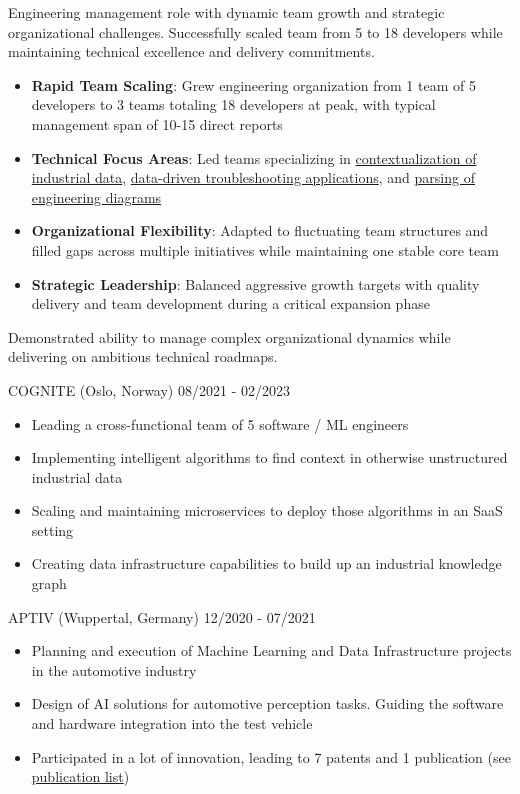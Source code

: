 \documentclass[singlesided,
               paper=a4,
               fontsize=10pt
              ]{my-resume}
\begin{document}
    {
        Engineering management role with dynamic team growth and strategic organizational challenges. Successfully scaled team from 5 to 18 developers while maintaining technical excellence and delivery commitments.

        \begin{itemize}[leftmargin=2em]
            \item \textbf{Rapid Team Scaling}: Grew engineering organization from 1 team of 5 developers to 3 teams totaling 18 developers at peak, with typical management span of 10-15 direct reports
            \item \textbf{Technical Focus Areas}: Led teams specializing in \href{https://www.cognite.com/en/contextualization}{contextualization of industrial data}, \href{https://www.cognite.com/en/industrial-canvas}{data-driven troubleshooting applications}, and \href{https://docs.cognite.com/cdf/integration/guides/contextualization/interactive_diagrams/}{parsing of engineering diagrams}
            \item \textbf{Organizational Flexibility}: Adapted to fluctuating team structures and filled gaps across multiple initiatives while maintaining one stable core team
            \item \textbf{Strategic Leadership}: Balanced aggressive growth targets with quality delivery and team development during a critical expansion phase
        \end{itemize}

        Demonstrated ability to manage complex organizational dynamics while delivering on ambitious technical roadmaps.
    }
%
	{COGNITE (Oslo, Norway)}
	{08/2021 - 02/2023}
    {\begin{itemize}[leftmargin=2em]
        \item Leading a cross-functional team of 5 software / ML engineers
        \item Implementing intelligent algorithms to find context in otherwise unstructured industrial data
        \item Scaling and maintaining microservices to deploy those algorithms in an SaaS setting
        \item Creating data infrastructure capabilities to build up an industrial knowledge graph
    \end{itemize}}
%
    {APTIV (Wuppertal, Germany)}
    {12/2020 - 07/2021}
    {\begin{itemize}[leftmargin=2em]
        \item Planning and execution of Machine Learning and Data Infrastructure projects in the automotive industry
        \item Design of AI solutions for automotive perception tasks. Guiding the software and hardware integration into the test vehicle
        \item Participated in a lot of innovation, leading to 7 patents and 1 publication (see \href{https://scholar.google.com/citations?hl=de&user=MnU8ZxwAAAAJ}{publication list})
    \end{itemize}}
\end{document}

